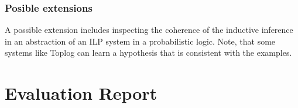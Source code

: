\subsection{Posible extensions}
A possible extension includes inspecting the coherence of the inductive inference in an abstraction of an ILP system in a probabilistic logic. Note, that some systems like Toplog can learn a hypothesis that is consistent with the examples.

\chapter{Evaluation Report}